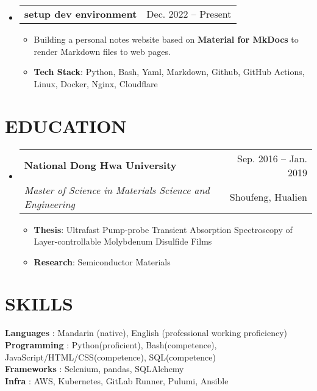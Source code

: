 \documentclass[letterpaper,11pt]{article}
\makeatletter
\newcommand{\resumeItem}[1]{
  \item\small{
    {#1 \vspace{-1pt}}
  }
}
\newcommand{\resumeSubheading}[4]{
  \vspace{-1pt}\item
    \begin{tabular*}{\textwidth}[t]{l@{\extracolsep{\fill}}r}
      \textbf{#1} & {\color{dark-grey}\small #2}\vspace{1pt}\\ %
      \textit{#3} & {\color{dark-grey} \small #4}\\ %
    \end{tabular*}\vspace{-4pt}
}
\newcommand{\resumeProjectHeading}[2]{
    \item
    \begin{tabular*}{\textwidth}{l@{\extracolsep{\fill}}r}
      #1 & {\color{dark-grey} #2} \\  %
    \end{tabular*}\vspace{-4pt}
}
\newcommand{\resumeSubHeadingListStart}{\begin{itemize}[leftmargin=0in, label={}]}
\newcommand{\resumeSubHeadingListEnd}{\end{itemize}}
\newcommand{\resumeItemListStart}{\begin{itemize}}
\newcommand{\resumeItemListEnd}{\end{itemize}\vspace{0pt}}
\makeatother
\begin{document}
    \resumeSubHeadingListStart
    \resumeProjectHeading
        {\textbf{setup dev environment}} {Dec. 2022 -- Present}
        \resumeItemListStart
          \resumeItem{Building a personal notes website based on \textbf{Material for MkDocs} to render Markdown files to web pages.}
          \resumeItem{ \textbf{Tech Stack}: Python, Bash, Yaml, Markdown, Github, GitHub Actions, Linux, Docker, Nginx, Cloudflare}
        \resumeItemListEnd          
    \resumeSubHeadingListEnd

\section {EDUCATION}
\resumeSubHeadingListStart
\resumeSubheading
  {National Dong Hwa University}{Sep. 2016 -- Jan. 2019}
  {Master of Science in Materials Science and Engineering}{Shoufeng, Hualien}
    \resumeItemListStart
  \resumeItem {\textbf{Thesis}: Ultrafast Pump-probe Transient Absorption Spectroscopy of Layer-controllable Molybdenum Disulfide Films}
    \resumeItem 
        {\textbf{Research}: Semiconductor Materials }
    \resumeItemListEnd
\resumeSubHeadingListEnd

%
\section{SKILLS}
 \begin{itemize}[leftmargin=0in, label={}]
    \small{\item{
     \textbf{Languages} {: Mandarin (native), English (professional working proficiency)}\vspace{2pt} \\
     \textbf{Programming} {: Python(proficient), Bash(competence), JavaScript/HTML/CSS(competence), SQL(competence)}\vspace{2pt} \\
     \textbf{Frameworks}     {: Selenium, pandas, SQLAlchemy} \\
     \textbf{Infra}     {: AWS, Kubernetes, GitLab Runner, Pulumi, Ansible}
    }}
 \end{itemize}


\end{document}

